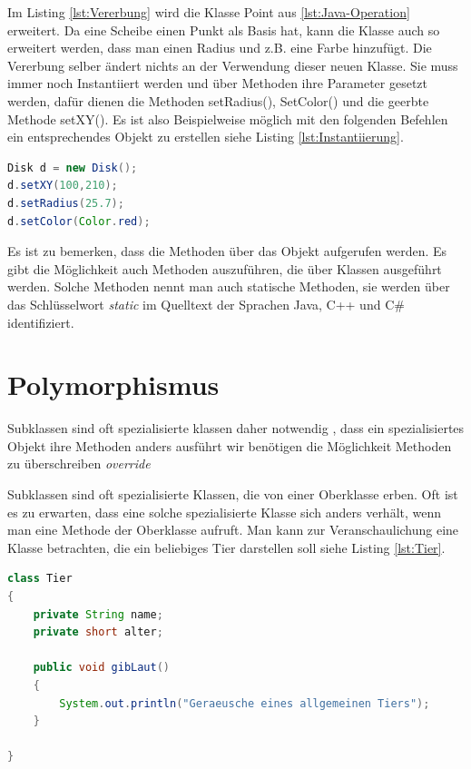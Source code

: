 \documentclass[
	12pt, %
	a4paper,
	listof=totoc, %
	bibliography=totoc, %
	numbers=noenddot, %
	ngerman, %
	headsepline, %
	oneside %
	]{scrbook} %
\begin{document}
Im Listing \ref{lst:Vererbung} wird die Klasse \glqq Point\grqq{}  aus \ref{lst:Java-Operation} erweitert. Da eine Scheibe einen Punkt als Basis hat, kann die Klasse auch so erweitert werden, dass man einen Radius und z.B. eine Farbe hinzufügt. Die Vererbung selber ändert nichts an der Verwendung dieser neuen Klasse. Sie muss immer noch Instantiiert werden und über Methoden ihre Parameter gesetzt werden, dafür dienen die Methoden setRadius(), SetColor() und die geerbte Methode setXY(). Es ist also Beispielweise möglich mit den folgenden Befehlen ein entsprechendes Objekt zu erstellen siehe Listing \ref{lst:Instantiierung}.

\begin{lstlisting}[language=Java, caption=Instantiierung der Klasse Disk \cite{OOPL}, label={lst:Instantiierung}]
Disk d = new Disk();
d.setXY(100,210);
d.setRadius(25.7);
d.setColor(Color.red);
\end{lstlisting}

Es ist zu bemerken, dass die Methoden über das Objekt aufgerufen werden. Es gibt die Möglichkeit auch Methoden auszuführen, die über Klassen ausgeführt werden. Solche Methoden nennt man auch statische Methoden, sie werden über das Schlüsselwort \emph{static} im Quelltext der Sprachen Java, C++ und C\# identifiziert.

\section{Polymorphismus}
Subklassen sind oft spezialisierte klassen
daher notwendig , dass ein spezialisiertes Objekt ihre Methoden anders ausführt
wir benötigen die Möglichkeit Methoden zu überschreiben \emph{override}

Subklassen sind oft spezialisierte Klassen, die von einer Oberklasse erben. Oft ist es zu erwarten, dass eine solche spezialisierte Klasse sich anders verhält, wenn man eine Methode der Oberklasse aufruft. Man kann zur Veranschaulichung eine Klasse betrachten, die ein beliebiges Tier darstellen soll siehe Listing \ref{lst:Tier}.

\begin{lstlisting}[language=Java, caption=Klasse Tier, label={lst:Tier}]
class Tier
{
    private String name;
    private short alter;
 
    public void gibLaut()
    {
        System.out.println("Geraeusche eines allgemeinen Tiers");
    }

}
\end{lstlisting}
\end{document}

